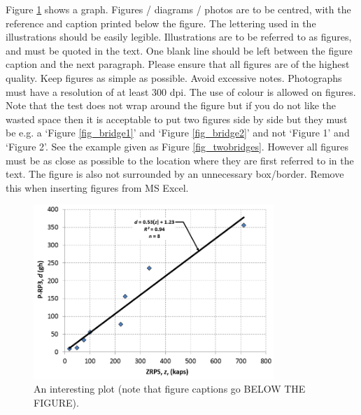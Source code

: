 \documentclass[a4paper,10pt]{article}
\begin{document}
Figure \ref{fig_regression} shows a graph.  Figures / diagrams / photos are to be centred, with the reference and caption printed below the figure. The lettering used in the illustrations should be easily legible.  Illustrations are to be referred to as figures, and must be quoted in the text. One blank line should be left between the figure caption and the next paragraph. Please ensure that all figures are of the highest quality. Keep figures as simple as possible. Avoid excessive notes. Photographs must have a resolution of at least 300 dpi. The use of colour is allowed on figures. Note that the test does not wrap around the figure but if you do not like the wasted space then it is acceptable to put two figures side by side but they must be e.g. a ‘Figure \ref{fig_bridge1}’ and ‘Figure \ref{fig_bridge2}’ and not ‘Figure 1’ and ‘Figure 2’. See the example given as Figure \ref{fig_twobridges}. However all figures must be as close as possible to the location where they are first referred to in the text. The figure is also not surrounded by an unnecessary box/border. Remove this when inserting figures from MS Excel.


\begin{figure}[ht]
\centering
\includegraphics[height=6.6cm]{figures/fig_regression}
\caption{An interesting plot (note that figure captions go BELOW THE FIGURE).}
\label{fig_regression}
\end{figure}
\end{document}
